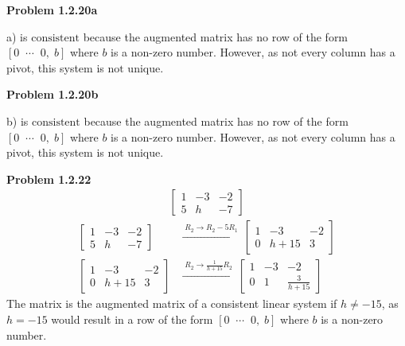 \documentclass[12pt]{article}
\begin{document}
\newpage

\textbf{Problem 1.2.20a} \par
\vspace{12pt}
a) is $\boxed{\text{consistent}}$ because the augmented matrix has no row of the form $[0 \;\; \cdots \;\; 0, \; b]$ where $b$ is a non-zero number. However, as not every column has a pivot, this system is $\boxed{\text{not unique}}$.

\bigskip

\textbf{Problem 1.2.20b} \par
\vspace{12pt}
b) is $\boxed{\text{consistent}}$ because the augmented matrix has no row of the form $[0 \;\; \cdots \;\; 0, \; b]$ where $b$ is a non-zero number. However, as not every column has a pivot, this system is $\boxed{\text{not unique}}$.

\newpage

\textbf{Problem 1.2.22} \begin{align*}
    \begin{bmatrix}
        1 & -3 & -2 \\
        5 & h & -7
    \end{bmatrix}
\end{align*} \begin{align*}
    \begin{bmatrix}
        1 & -3 & -2 \\
        5 & h & -7
    \end{bmatrix}
    & \xrightarrow{\; R_2 \to R_2 - 5R_1 \;} 
    \begin{bmatrix}
        1 & -3 & -2 \\
        0 & h + 15 & 3
    \end{bmatrix} \\[6pt]
    \begin{bmatrix}
        1 & -3 & -2 \\
        0 & h + 15 & 3
    \end{bmatrix} 
    & \xrightarrow{\; R_2 \to \frac{1}{h + 15}R_2 \;} 
    \begin{bmatrix}
        1 & -3 & -2 \\
        0 & 1 & \frac{3}{h + 15}
    \end{bmatrix} 
\end{align*}
The matrix is the augmented matrix of a consistent linear system if $\boxed{h \neq -15}$, as $h = -15$ would result in a row of the form $[0 \;\; \cdots \;\; 0, \; b]$ where $b$ is a non-zero number.
\end{document}
